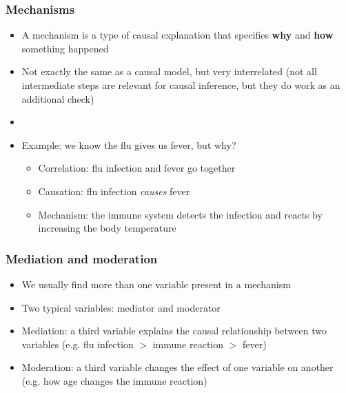 \documentclass[aspectratio=43]{beamer}
\begin{document}
\begin{frame}
\frametitle{Mechanisms}
\centering

\begin{itemize}
\item A mechanism is a type of causal explanation that specifies \textbf{why} and \textbf{how} something happened
\item Not exactly the same as a causal model, but very interrelated (not all intermediate steps are relevant for causal inference, but they do work as an additional check)
\item[]
\item Example: we know the flu gives us fever, but why?
\begin{itemize}
\item Correlation: flu infection and fever go together
\item Causation: flu infection \textit{causes} fever
\item Mechanism: the immune system detects the infection and reacts by increasing the body temperature
\end{itemize}
\end{itemize}

\end{frame}

\begin{frame}
\frametitle{Mediation and moderation}
\centering

\begin{itemize}
\item We usually find more than one variable present in a mechanism
\item Two typical variables: mediator and moderator
\item Mediation: a third variable explains the causal relationship between two variables (e.g. flu infection $>$ immune reaction $>$ fever)
\item Moderation: a third variable changes the effect of one variable on another (e.g. how age changes the immune reaction)
\end{itemize}

\end{frame}
\end{document}

